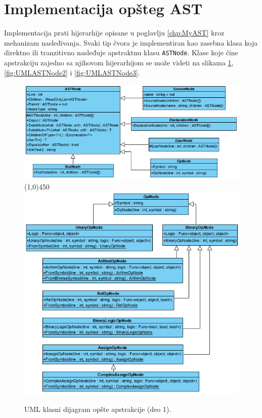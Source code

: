 \section{Implementacija opšteg AST}
\label{sec:ImplementationMyAST}

Implementacija prati hijerarhije opisane u poglavlju \ref{chp:MyAST} kroz mehanizam nasleđivanja. Svaki tip čvora je implementiran kao zasebna klasa koja direktno ili tranzitivno nasleđuje apstraktnu klasu \texttt{ASTNode}. Klase koje čine apstrakciju zajedno sa njihovom hijerarhijom se može videti na slikama \ref{fig:UMLASTNode1}, \ref{fig:UMLASTNode2} i \ref{fig:UMLASTNode3}. 

\begin{figure}[h!]
\centering
\includegraphics[scale=0.7]{images/uml/ASTNode.png}
\line(1,0){450}\\
\includegraphics[scale=0.7]{images/uml/OperatorNode.png}
\caption{UML klasni dijagram opšte apstrakcije (deo 1).}
\label{fig:UMLASTNode1}
\end{figure}

